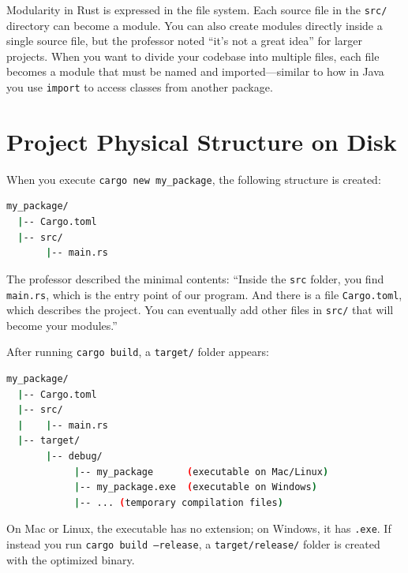 Modularity in Rust is expressed in the file system. Each source file in the \texttt{src/} directory can become a module. You can also create modules directly inside a single source file, but the professor noted ``it's not a great idea'' for larger projects. When you want to divide your codebase into multiple files, each file becomes a module that must be named and imported---similar to how in Java you use \texttt{import} to access classes from another package.

\section{Project Physical Structure on Disk}


When you execute \texttt{cargo new my\_package}, the following structure is created:

\begin{lstlisting}[language=bash]
my_package/
  |-- Cargo.toml
  |-- src/
       |-- main.rs
\end{lstlisting}

The professor described the minimal contents: ``Inside the \texttt{src} folder, you find \texttt{main.rs}, which is the entry point of our program. And there is a file \texttt{Cargo.toml}, which describes the project. You can eventually add other files in \texttt{src/} that will become your modules.''

After running \texttt{cargo build}, a \texttt{target/} folder appears:

\begin{lstlisting}[language=bash]
my_package/
  |-- Cargo.toml
  |-- src/
  |    |-- main.rs
  |-- target/
       |-- debug/
            |-- my_package      (executable on Mac/Linux)
            |-- my_package.exe  (executable on Windows)
            |-- ... (temporary compilation files)
\end{lstlisting}

On Mac or Linux, the executable has no extension; on Windows, it has \texttt{.exe}. If instead you run \texttt{cargo build --release}, a \texttt{target/release/} folder is created with the optimized binary.


